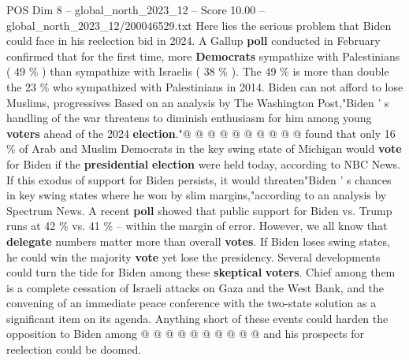 \begin{textsample}{POS Dim 8 – global\_north\_2023\_12 – Score 10.00 – global\_north\_2023\_12/200046529.txt}
Here lies the serious problem that Biden could face in his reelection bid in 2024.
A Gallup \textbf{poll} conducted in February confirmed that for the first time, more \textbf{Democrats} sympathize with Palestinians ( 49 \% ) than sympathize with Israelis ( 38 \% ).
The 49 \% is more than double the 23 \% who sympathized with Palestinians in 2014.
Biden can not afford to lose Muslims, progressives Based on an analysis by The Washington Post,"Biden ' s handling of the war threatens to diminish enthusiasm for him among young \textbf{voters} ahead of the 2024 \textbf{election}."@ @ @ @ @ @ @ @ @ @ found that only 16 \% of Arab and Muslim Democrats in the key swing state of Michigan would \textbf{vote} for Biden if the \textbf{presidential} \textbf{election} were held today, according to NBC News.
If this exodus of support for Biden persists, it would threaten"Biden ' s chances in key swing states where he won by slim margins,"according to an analysis by Spectrum News.
A recent \textbf{poll} showed that public support for Biden vs.
Trump runs at 42 \% vs. 41 \% -- within the margin of error.
However, we all know that \textbf{delegate} numbers matter more than overall \textbf{votes}.
If Biden loses swing states, he could win the majority \textbf{vote} yet lose the presidency.
Several developments could turn the tide for Biden among these \textbf{skeptical} \textbf{voters}.
Chief among them is a complete cessation of Israeli attacks on Gaza and the West Bank, and the convening of an immediate peace conference with the two-state solution as a significant item on its agenda.
Anything short of these events could harden the opposition to Biden among @ @ @ @ @ @ @ @ @ @ and his prospects for reelection could be doomed.

\end{textsample}
